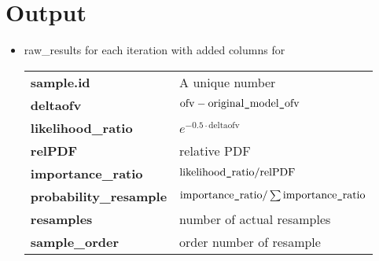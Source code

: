 
\section{Output}
\begin{itemize}
\item raw\_results for each iteration with added columns for\\
\begin{tabular}{ll}
\bf{sample.id} & A unique number\\
\bf{deltaofv} & $\mathrm{ofv} - \mathrm{original}\mbox{\tt\string_}\mathrm{model}\mbox{\tt\string_}\mathrm{ofv}$\\
\bf{likelihood\_ratio} & $e^{-0.5\cdot \mathrm{deltaofv}}$ \\
\bf{relPDF} & relative PDF \\
\bf{importance\_ratio} & $\mathrm{likelihood}\mbox{\tt\string_}\mathrm{ratio}/\mathrm{relPDF}$\\
\bf{probability\_resample} & $\mathrm{importance}\mbox{\tt\string_}\mathrm{ratio}/\sum{\mathrm{importance}\mbox{\tt\string_}\mathrm{ratio}}$ \\
\bf{resamples} & number of actual resamples \\
\bf{sample\_order} & order number of resample \\
\end{tabular}


\end{itemize}
